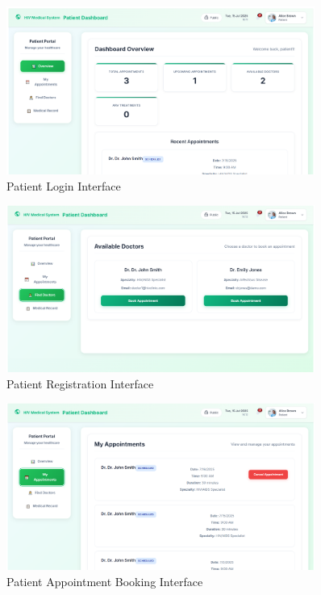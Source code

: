 \documentclass[12pt,a4paper]{article}
\begin{document}
\begin{figure}[H]
\centering
\includegraphics[width=0.9\textwidth]{images/patient_login.png}
\caption{Patient Login Interface}
\label{fig:patient-login}
\end{figure}

\begin{figure}[H]
\centering
\includegraphics[width=0.9\textwidth]{images/patient_register.png}
\caption{Patient Registration Interface}
\label{fig:patient-register}
\end{figure}

\begin{figure}[H]
\centering
\includegraphics[width=0.9\textwidth]{images/patient_booking.png}
\caption{Patient Appointment Booking Interface}
\label{fig:patient-booking}
\end{figure}
\end{document}
